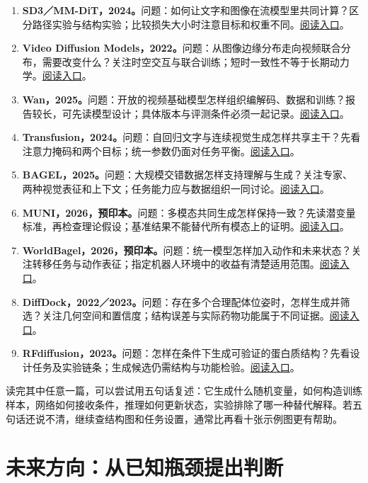 \begin{enumerate}[leftmargin=*,itemsep=0.65em]
\item \textbf{SD3／MM-DiT，2024。}问题：如何让文字和图像在流模型里共同计算？区分路径实验与结构实验；比较损失大小时注意目标和权重不同。\href{https://arxiv.org/abs/2403.03206}{阅读入口}。\cite{a_sd3}
\item \textbf{Video Diffusion Models，2022。}问题：从图像边缘分布走向视频联合分布，需要改变什么？关注时空交互与联合训练；短时一致性不等于长期动力学。\href{https://arxiv.org/abs/2204.03458}{阅读入口}。\cite{a_videodiff}
\item \textbf{Wan，2025。}问题：开放的视频基础模型怎样组织编解码、数据和训练？报告较长，可先读模型设计；具体版本与评测条件必须一起记录。\href{https://arxiv.org/abs/2503.20314}{阅读入口}。\cite{a_wan}
\item \textbf{Transfusion，2024。}问题：自回归文字与连续视觉生成怎样共享主干？先看注意力掩码和两个目标；统一参数仍面对任务平衡。\href{https://arxiv.org/abs/2408.11039}{阅读入口}。\cite{a_transfusion}
\item \textbf{BAGEL，2025。}问题：大规模交错数据怎样支持理解与生成？关注专家、两种视觉表征和上下文；任务能力应与数据组织一同讨论。\href{https://arxiv.org/abs/2505.14683}{阅读入口}。\cite{a_bagel}
\item \textbf{MUNI，2026，预印本。}问题：多模态共同生成怎样保持一致？先读潜变量标准，再检查理论假设；基准结果不能替代所有模态上的证明。\href{https://arxiv.org/abs/2606.16408}{阅读入口}。\cite{a_muni}
\item \textbf{WorldBagel，2026，预印本。}问题：统一模型怎样加入动作和未来状态？关注转移任务与动作表征；指定机器人环境中的收益有清楚适用范围。\href{https://arxiv.org/abs/2607.03461}{阅读入口}。\cite{a_worldbagel}
\item \textbf{DiffDock，2022／2023。}问题：存在多个合理配体位姿时，怎样生成并筛选？关注几何空间和置信度；结构误差与实际药物功能属于不同证据。\href{https://arxiv.org/abs/2210.01776}{阅读入口}。\cite{a_diffdock}
\item \textbf{RFdiffusion，2023。}问题：怎样在条件下生成可验证的蛋白质结构？先看设计任务及实验链条；生成候选仍需结构与功能检验。\href{https://www.nature.com/articles/s41586-023-06415-8}{阅读入口}。\cite{a_rfdiffusion}
\end{enumerate}

读完其中任意一篇，可以尝试用五句话复述：它生成什么随机变量，如何构造训练样本，网络如何接收条件，推理如何更新状态，实验排除了哪一种替代解释。若五句话还说不清，继续查结构图和任务设置，通常比再看十张示例图更有帮助。

\section{未来方向：从已知瓶颈提出判断}
\label{sec:application-future}

